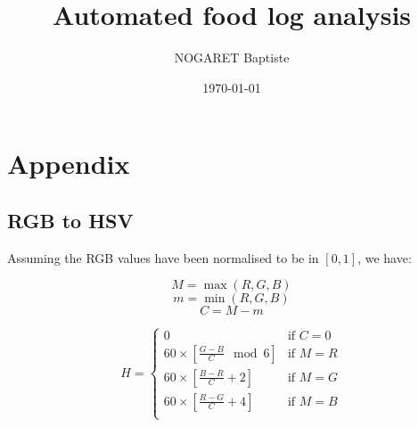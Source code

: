 \documentclass[12pt]{book}
\title{Automated food log analysis}
\author{NOGARET Baptiste}
\date{\today}
\begin{document}
\frontmatter

\maketitle





\sstableofcontents

\sslistoffigures

\sslistoftables





%
%
\mainmatter


















%
%
\appendix

\chapter{Appendix}

\section{RGB to HSV}

Assuming the RGB values have been normalised to be in $[0, 1]$, we have:

$$M = \max (R, G, B)$$
$$m = \min (R, G, B)$$
$$C = M - m$$

$$
H =
\begin{cases}
0 & \text{if $C = 0$}\\
60 \times \left[ \frac{G - B}{C} \mod 6\right] & \text{if $M = R$} \\
60 \times \left[ \frac{B - R}{C} + 2\right] & \text{if $M = G$} \\
60 \times \left[ \frac{R - G}{C} + 4\right] & \text{if $M = B$} \\
\end{cases}
$$
\end{document}
